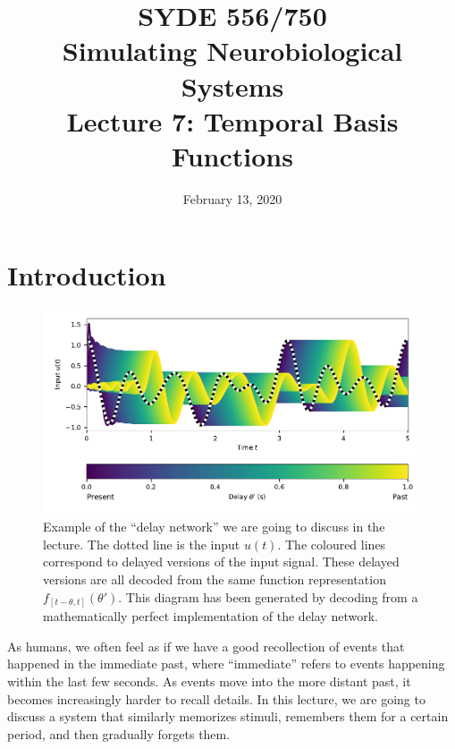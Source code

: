 \documentclass[10pt,letterpaper,oneside]{article}
\date{February 13, 2020}
\title{SYDE 556/750 \\ Simulating Neurobiological Systems \\ Lecture 7: Temporal Basis Functions}
\begin{document}

\section{Introduction}

\begin{figure}[h]
	\centering
	\includegraphics{media/delay_network_decoding.pdf}
	\caption{Example of the \enquote{delay network} we are going to discuss in the lecture. The dotted line is the input $u(t)$. The coloured lines correspond to delayed versions of the input signal. These delayed versions are all decoded from the same function representation $f_{[t - \theta, t]}(\theta')$. This diagram has been generated by decoding from a mathematically perfect implementation of the delay network. }
\end{figure}


As humans, we often feel as if we have a good recollection of events that happened in the immediate past, where \enquote{immediate} refers to events happening within the last few seconds. As events move into the more distant past, it becomes increasingly harder to recall details. In this lecture, we are going to discuss a system that similarly memorizes stimuli, remembers them for a certain period, and then gradually forgets them.
\end{document}
